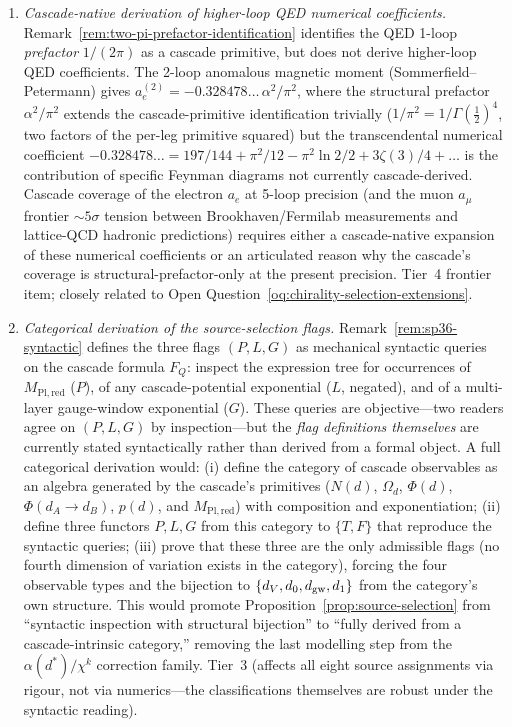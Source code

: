 \documentclass[12pt,a4paper]{article}
\begin{document}
\begin{enumerate}
\item\label{oq:higher-loop-qed-coefficients} \emph{Cascade-native derivation of higher-loop QED numerical coefficients.} Remark~\ref{rem:two-pi-prefactor-identification} identifies the QED 1-loop \emph{prefactor} $1/(2\pi)$ as a cascade primitive, but does not derive higher-loop QED coefficients. The 2-loop anomalous magnetic moment (Sommerfield--Petermann) gives $a_e^{(2)} = -0.328478\ldots\,\alpha^2/\pi^2$, where the structural prefactor $\alpha^2/\pi^2$ extends the cascade-primitive identification trivially ($1/\pi^2 = 1/\Gamma(\tfrac{1}{2})^4$, two factors of the per-leg primitive squared) but the transcendental numerical coefficient $-0.328478\ldots = 197/144 + \pi^2/12 - \pi^2\ln 2/2 + 3\zeta(3)/4 + \ldots$ is the contribution of specific Feynman diagrams not currently cascade-derived. Cascade coverage of the electron $a_e$ at 5-loop precision (and the muon $a_\mu$ frontier $\sim 5\sigma$ tension between Brookhaven/Fermilab measurements and lattice-QCD hadronic predictions) requires either a cascade-native expansion of these numerical coefficients or an articulated reason why the cascade's coverage is structural-prefactor-only at the present precision. Tier~4 frontier item; closely related to Open Question~\ref{oq:chirality-selection-extensions}.

\item\label{oq:source-selection-category} \emph{Categorical derivation of the source-selection flags.} Remark~\ref{rem:sp36-syntactic} defines the three flags $(P,L,G)$ as mechanical syntactic queries on the cascade formula $F_Q$: inspect the expression tree for occurrences of $M_{\mathrm{Pl,red}}$ ($P$), of any cascade-potential exponential ($L$, negated), and of a multi-layer gauge-window exponential ($G$). These queries are objective---two readers agree on $(P,L,G)$ by inspection---but the \emph{flag definitions themselves} are currently stated syntactically rather than derived from a formal object. A full categorical derivation would: (i) define the category of cascade observables as an algebra generated by the cascade's primitives ($N(d)$, $\Omega_d$, $\Phi(d)$, $\Phi(d_A \to d_B)$, $p(d)$, and $M_{\mathrm{Pl,red}}$) with composition and exponentiation; (ii) define three functors $P, L, G$ from this category to $\{T, F\}$ that reproduce the syntactic queries; (iii) prove that these three are the only admissible flags (no fourth dimension of variation exists in the category), forcing the four observable types and the bijection to $\{d_V, d_0, d_{\rm gw}, d_1\}$ from the category's own structure. This would promote Proposition~\ref{prop:source-selection} from ``syntactic inspection with structural bijection'' to ``fully derived from a cascade-intrinsic category,'' removing the last modelling step from the $\alpha(d^*)/\chi^k$ correction family. Tier~3 (affects all eight source assignments via rigour, not via numerics---the classifications themselves are robust under the syntactic reading).


\end{enumerate}
\end{document}
